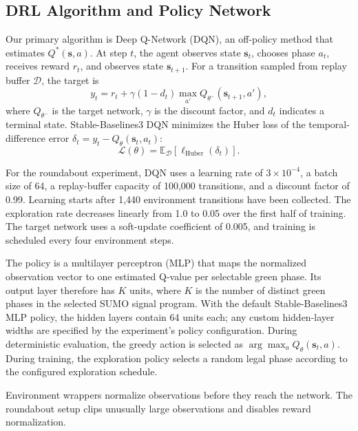 \subsection{DRL Algorithm and Policy Network}
Our primary algorithm is Deep Q-Network (DQN), an off-policy method that estimates $Q^*(\mathbf{s},a)$. At step $t$, the agent observes state $\mathbf{s}_t$, chooses phase $a_t$, receives reward $r_t$, and observes state $\mathbf{s}_{t+1}$. For a transition sampled from replay buffer $\mathcal{D}$, the target is
\begin{equation*}
y_t = r_t + \gamma(1-d_t)\max_{a'} Q_{\theta^-}(\mathbf{s}_{t+1},a'),
\end{equation*}
where $Q_{\theta^-}$ is the target network, $\gamma$ is the discount factor, and $d_t$ indicates a terminal state. Stable-Baselines3 DQN minimizes the Huber loss of the temporal-difference error $\delta_t=y_t-Q_\theta(\mathbf{s}_t,a_t)$:
\begin{equation*}
\mathcal{L}(\theta)=\mathbb{E}_{\mathcal{D}}\left[\ell_{\mathrm{Huber}}(\delta_t)\right].
\end{equation*}

For the roundabout experiment, DQN uses a learning rate of $3\times10^{-4}$, a batch size of 64, a replay-buffer capacity of 100,000 transitions, and a discount factor of 0.99. Learning starts after 1,440 environment transitions have been collected. The exploration rate decreases linearly from 1.0 to 0.05 over the first half of training. The target network uses a soft-update coefficient of 0.005, and training is scheduled every four environment steps.

The policy is a multilayer perceptron (MLP) that maps the normalized observation vector to one estimated Q-value per selectable green phase. Its output layer therefore has $K$ units, where $K$ is the number of distinct green phases in the selected SUMO signal program. With the default Stable-Baselines3 MLP policy, the hidden layers contain 64 units each; any custom hidden-layer widths are specified by the experiment's policy configuration. During deterministic evaluation, the greedy action is selected as $\arg\max_a Q_\theta(\mathbf{s}_t,a)$. During training, the exploration policy selects a random legal phase according to the configured exploration schedule.

Environment wrappers normalize observations before they reach the network. The roundabout setup clips unusually large observations and disables reward normalization.

